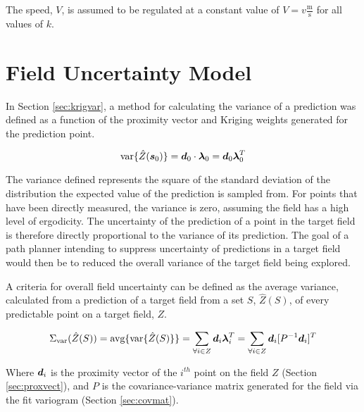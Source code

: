 The speed, $V$, is assumed to be regulated at a constant value of $V = v \frac{\text{m}}{\text{s}}$ for all values of $k$.

\section{Field Uncertainty Model} \label{sec:fielduncert}
In Section \ref{sec:krigvar}, a method for calculating the variance of a prediction was defined as a function of the proximity vector and Kriging weights generated for the prediction point.

\begin{equation}
    \text{var}\{\hat{Z}({\it{\boldsymbol{s}}}_0)\} = {\it{\boldsymbol{d}}}_0 \cdot {\it{\boldsymbol{\lambda}}}_0 = {\it{\boldsymbol{d}}}_0 {\it{\boldsymbol{\lambda}}}_0^T
\end{equation}

The variance defined represents the square of the standard deviation of the distribution the expected value of the prediction is sampled from. For points that have been directly measured, the variance is zero, assuming the field has a high level of ergodicity. The uncertainty of the prediction of a point in the target field is therefore directly proportional to the variance of its prediction. The goal of a path planner intending to suppress uncertainty of predictions in a target field would then be to reduced the overall variance of the target field being explored.

A criteria for overall field uncertainty can be defined as the average variance, calculated from a prediction of a target field from a set $S$, $\hat{Z}(S)$, of every predictable point on a target field, $Z$.

\begin{equation}
	\Sigma_{\text{var}}(\hat{Z}(S)) = \text{avg}\{{\text{var}\{\hat{Z}(S)\}}\} = \sum_{\forall i \in Z} {\it{\boldsymbol{d}}}_i {\it{\boldsymbol{\lambda}}}_i^T = \sum_{\forall i \in Z} {\it{\boldsymbol{d}}}_i [P^{-1}{\it{\boldsymbol{d}}}_i]^T
	\label{eq:fielduncert}
\end{equation}

Where ${\it{\boldsymbol{d}}}_i$ is the proximity vector of the $i^{th}$ point on the field $Z$ (Section \ref{sec:proxvect}), and $P$ is the covariance-variance matrix generated for the field via the fit variogram (Section \ref{sec:covmat}).